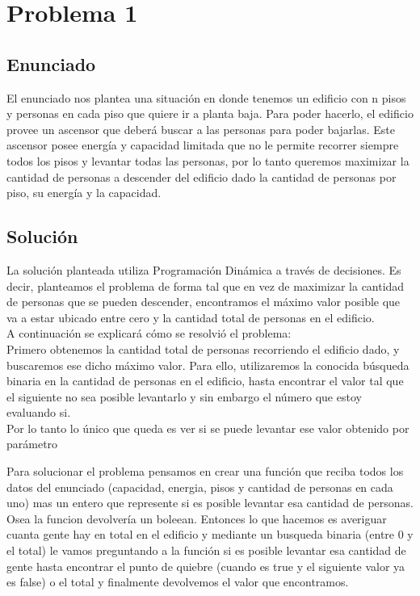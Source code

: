 \section{Problema 1}

\subsection{Enunciado}
El enunciado nos plantea una situación en donde tenemos un edificio con n pisos y personas en cada piso que quiere ir a planta baja. Para poder hacerlo, el edificio provee un 
ascensor que deberá buscar a las personas para poder bajarlas. 
Este ascensor posee energía y capacidad limitada que no le permite recorrer siempre todos los pisos y levantar todas las personas, por lo tanto queremos maximizar la cantidad
de personas a descender del edificio dado la cantidad de personas por piso, su energía y la capacidad.

\subsection{Soluci\'on}
La solución planteada utiliza Programación Dinámica a través de decisiones. Es decir, planteamos el problema de forma tal que en vez de maximizar la cantidad de personas que 
se pueden descender, encontramos el máximo valor posible que va a estar ubicado entre cero y la cantidad total de personas en el edificio.\\
A continuación se explicará cómo se resolvió el problema:\\
Primero obtenemos la cantidad total de personas recorriendo el edificio dado, y buscaremos ese dicho máximo valor.
Para ello, utilizaremos la conocida búsqueda binaria en la cantidad de personas en el edificio, hasta encontrar el valor tal que el siguiente no sea posible levantarlo y sin embargo el número que estoy evaluando si.\\
Por lo tanto lo único que queda es ver si se puede levantar ese valor obtenido por parámetro


Para solucionar el problema pensamos en crear una función que reciba todos los datos del enunciado (capacidad, energia, pisos y cantidad de personas en cada uno) mas un entero que represente si es posible levantar esa cantidad de personas. Osea la funcion devolvería un boleean. Entonces lo que hacemos es averiguar cuanta gente hay en total en el edificio y mediante un busqueda binaria (entre 0 y el total) le vamos preguntando a la función si es posible levantar esa cantidad de gente hasta encontrar el punto de quiebre (cuando es true y el siguiente valor ya es false) o el total y finalmente devolvemos el valor que encontramos.

